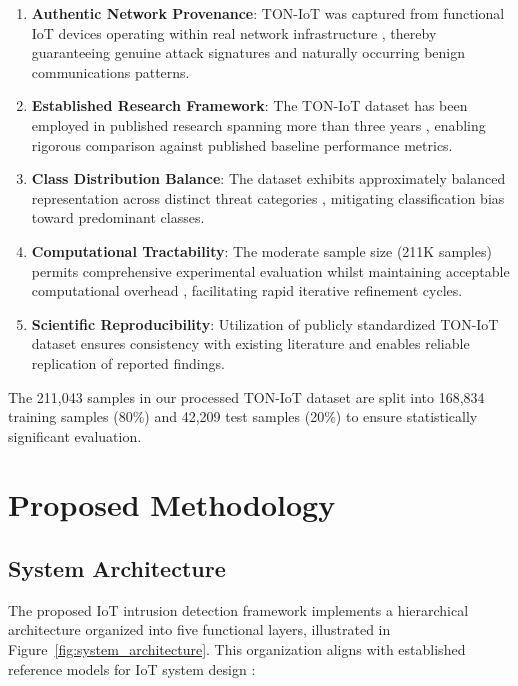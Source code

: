 \documentclass[conference]{IEEEtran}
\begin{document}
\begin{enumerate}
\item \textbf{Authentic Network Provenance}: TON-IoT was captured from functional IoT devices operating within real network infrastructure \cite{b19}, thereby guaranteeing genuine attack signatures and naturally occurring benign communications patterns.

\item \textbf{Established Research Framework}: The TON-IoT dataset has been employed in published research spanning more than three years \cite{b12, b17}, enabling rigorous comparison against published baseline performance metrics.

\item \textbf{Class Distribution Balance}: The dataset exhibits approximately balanced representation across distinct threat categories \cite{b19}, mitigating classification bias toward predominant classes.

\item \textbf{Computational Tractability}: The moderate sample size (211K samples) permits comprehensive experimental evaluation whilst maintaining acceptable computational overhead \cite{b15}, facilitating rapid iterative refinement cycles.

\item \textbf{Scientific Reproducibility}: Utilization of publicly standardized TON-IoT dataset ensures consistency with existing literature \cite{b23} and enables reliable replication of reported findings.
\end{enumerate}

The 211,043 samples in our processed TON-IoT dataset are split into 168,834 training samples (80\%) and 42,209 test samples (20\%) to ensure statistically significant evaluation.

\section{Proposed Methodology}

\subsection{System Architecture}

The proposed IoT intrusion detection framework implements a hierarchical architecture \cite{b1} organized into five functional layers, illustrated in Figure~\ref{fig:system_architecture}. This organization aligns with established reference models for IoT system design \cite{b3}:
\end{document}
